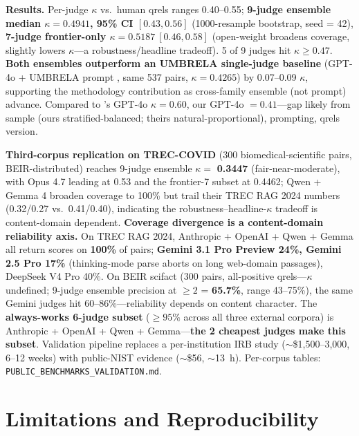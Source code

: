 \documentclass[11pt,letterpaper]{article}
\begin{document}
\textbf{Results.} Per-judge $\kappa$ vs.\ human qrels ranges 0.40--0.55; \textbf{9-judge ensemble median $\kappa = 0.4941$, 95\% CI $[0.43, 0.56]$} (1000-resample bootstrap, seed = 42), \textbf{7-judge frontier-only $\kappa = 0.5187\ [0.46, 0.58]$} (open-weight broadens coverage, slightly lowers $\kappa$---a robustness/headline tradeoff). 5 of 9 judges hit $\kappa \geq 0.47$. \textbf{Both ensembles outperform an UMBRELA single-judge baseline} (GPT-4o + UMBRELA prompt \citep{upadhyay2024umbrela}, same 537 pairs, $\kappa = 0.4265$) by 0.07--0.09 $\kappa$, supporting the methodology contribution as cross-family ensemble (not prompt) advance. Compared to \citet{thakur2025trecragsupport}'s GPT-4o $\kappa = 0.60$, our GPT-4o $= 0.41$---gap likely from sample (ours stratified-balanced; theirs natural-proportional), prompting, qrels version.

\textbf{Third-corpus replication on TREC-COVID} (300 biomedical-scientific pairs, BEIR-distributed) reaches 9-judge ensemble $\kappa = $ \textbf{0.3447} (fair-near-moderate), with Opus 4.7 leading at 0.53 and the frontier-7 subset at 0.4462; Qwen + Gemma 4 broaden coverage to 100\% but trail their TREC RAG 2024 numbers (0.32/0.27 vs.\ 0.41/0.40), indicating the robustness--headline-$\kappa$ tradeoff is content-domain dependent. \textbf{Coverage divergence is a content-domain reliability axis.} On TREC RAG 2024, Anthropic + OpenAI + Qwen + Gemma all return scores on \textbf{100\%} of pairs; \textbf{Gemini 3.1 Pro Preview 24\%, Gemini 2.5 Pro 17\%} (thinking-mode parse aborts on long web-domain passages), DeepSeek V4 Pro 40\%. On BEIR scifact (300 pairs, all-positive qrels---$\kappa$ undefined; 9-judge ensemble precision at $\geq 2$ = \textbf{65.7\%}, range 43--75\%), the same Gemini judges hit 60--86\%---reliability depends on content character. The \textbf{always-works 6-judge subset} ($\geq 95\%$ across all three external corpora) is Anthropic + OpenAI + Qwen + Gemma---\textbf{the 2 cheapest judges make this subset}. Validation pipeline replaces a per-institution IRB study ($\sim$\$1{,}500--3{,}000, 6--12 weeks) with public-NIST evidence ($\sim$\$56, $\sim$13~h). Per-corpus tables: \texttt{PUBLIC\_BENCHMARKS\_VALIDATION.md}.

\section{Limitations and Reproducibility}\label{sec:limits}
\end{document}
